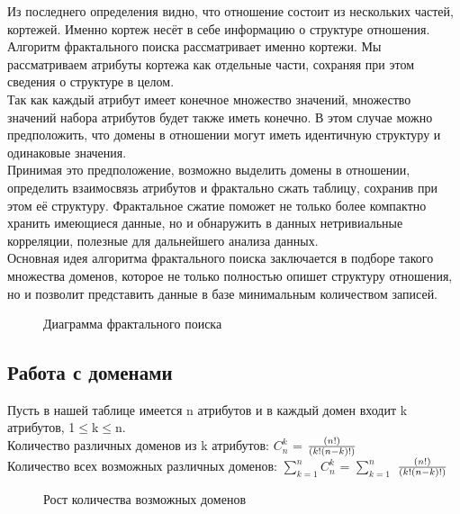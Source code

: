 Из последнего определения видно, что отношение состоит из нескольких частей, кортежей. Именно кортеж несёт в себе информацию о структуре отношения.
\\

Алгоритм фрактального поиска рассматривает именно кортежи. Мы рассматриваем атрибуты кортежа как отдельные части, сохраняя при этом сведения о структуре в целом. 
\\

Так как каждый атрибут имеет конечное множество значений, множество значений набора атрибутов будет также иметь конечно. В этом случае можно предположить, что домены в отношении могут иметь идентичную структуру и одинаковые значения. 
\\

Принимая это предположение, возможно выделить домены в отношении, определить взаимосвязь атрибутов и фрактально сжать таблицу, сохранив при этом её структуру. Фрактальное сжатие поможет не только более компактно хранить имеющиеся данные, но и обнаружить в данных нетривиальные корреляции, полезные для дальнейшего анализа данных.
\\

Основная идея алгоритма фрактального поиска заключается в подборе такого множества доменов, которое не только полностью опишет структуру отношения, но и позволит представить данные в базе минимальным количеством записей. 
\\

\begin{figure}[H]
\center{\texttt{[image: 02\_A0]}}
\caption{Диаграмма фрактального поиска}
\label{ris:image}
\end{figure}

\pagebreak

\subsection{Работа с доменами}

Пусть в нашей таблице имеется n атрибутов и в каждый домен входит k атрибутов, 1$\leq$k$\leq$n. 
\\

Количество различных доменов из k атрибутов: 
$C_n^k$ =  $(n!)\over (k!(n-k)!)$
\\

Количество всех возможных различных доменов: 
$\sum_{k=1}^n C_n^k$ =  $\sum_{k=1}^n$ $(n!)\over (k!(n-k)!)$

\begin{figure}[H]
\caption{Рост количества возможных доменов}
\end{figure}

